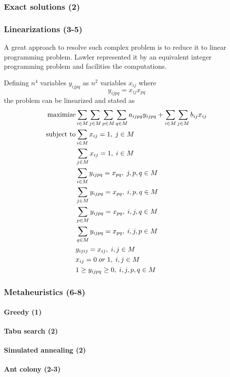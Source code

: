 \subsubsection{Exact solutions (2)}
\subsubsection{Linearizations (3-5)}

A great approach to resolve such complex problem is to reduce it to linear programming problem.
Lawler represented it by an equivalent integer programming problem and facilities the computations.

Defining $n^4$ variables $y_{ijpq}$ as $n^2$ variables $x_{ij}$ where
\begin{equation}
y_{ijpq} = x_{ij}x_{pq}
\end{equation}
the problem can be linearized and stated as
\begin{align}
  \text{maximize} &\null \sum_{i \in M} \sum_{j \in M} \sum_{p \in M} \sum_{q \in M} a_{ijpg}y_{ijpq} + \sum_{i \in M} \sum_{j \in M} b_{ij} x_{ij} \\
  \text{subject to} &\null \sum_{i \in M} x_{ij} = 1, \; j \in M \\
  &\null \sum_{j \in M} x_{ij} = 1, \; i \in M \\
  &\null \sum_{i \in M} y_{ijpq} = x_{pq}, \; j, p, q \in M \\
  &\null \sum_{j \in M} y_{ijpq} = x_{pq}, \; i, p, q \in M \\
  &\null \sum_{p \in M} y_{ijpq} = x_{pq}, \; i, j, q \in M \\
  &\null \sum_{q \in M} y_{ijpq}= x_{pq}, \; i, j, p \in M \\
  &\null y_{ijij} = x_{ij}, \; i, j \in M \\
  &\null x_{ij} = 0 \; or \; 1, \; i, j \in M \\
  &\null 1 \geq y_{ijpq} \geq 0, \; i, j, p, q \in M
\end{align}

\subsubsection{Metaheuristics (6-8)}

\paragraph{Greedy (1)}
\paragraph{Tabu search (2)}
\paragraph{Simulated annealing (2)}
\paragraph{Ant colony (2-3)}

